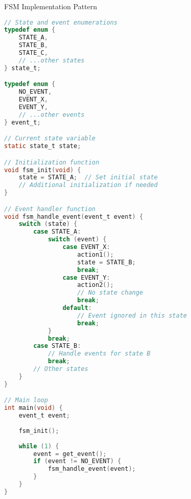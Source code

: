 \begin{code}{FSM Implementation Pattern}
\begin{lstlisting}[language=C, style=basesmol]
// State and event enumerations
typedef enum {
    STATE_A,
    STATE_B,
    STATE_C,
    // ...other states
} state_t;

typedef enum {
    NO_EVENT,
    EVENT_X,
    EVENT_Y,
    // ...other events
} event_t;

// Current state variable
static state_t state;

// Initialization function
void fsm_init(void) {
    state = STATE_A;  // Set initial state
    // Additional initialization if needed
}

// Event handler function
void fsm_handle_event(event_t event) {
    switch (state) {
        case STATE_A:
            switch (event) {
                case EVENT_X:
                    action1();
                    state = STATE_B;
                    break;
                case EVENT_Y:
                    action2();
                    // No state change
                    break;
                default:
                    // Event ignored in this state
                    break;
            }
            break;
        case STATE_B:
            // Handle events for state B
            break;
        // Other states
    }
}

// Main loop
int main(void) {
    event_t event;
    
    fsm_init();
    
    while (1) {
        event = get_event();
        if (event != NO_EVENT) {
            fsm_handle_event(event);
        }
    }
}
\end{lstlisting}
\end{code}

